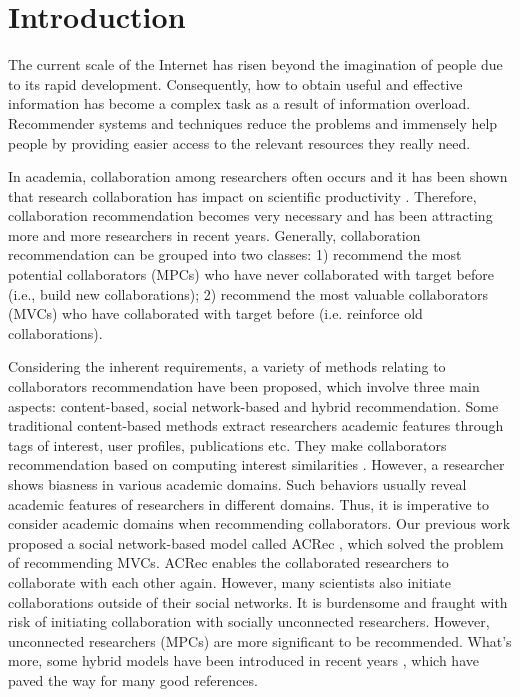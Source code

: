 \section*{Introduction}
The current scale of the Internet has risen beyond the imagination of people due to its rapid development. Consequently, how to obtain useful and effective information has become a complex task as a result of information overload. Recommender systems and techniques reduce the problems and immensely help people by providing easier access to the relevant resources they really need.

In academia, collaboration among researchers often occurs and it has been shown that research collaboration has impact on scientific productivity \cite{lee2005impact}. Therefore, collaboration recommendation becomes very necessary and has been attracting more and more researchers in recent years. Generally, collaboration recommendation can be grouped into two classes: 1) recommend the most potential collaborators (MPCs) who have never collaborated with target before (i.e., build new collaborations); 2) recommend the most valuable collaborators (MVCs) who have collaborated with target before (i.e. reinforce old collaborations).

Considering the inherent requirements, a variety of methods relating to collaborators recommendation have been proposed, which involve three main aspects: content-based, social network-based and hybrid recommendation. Some traditional content-based methods extract researchers academic features through tags of interest, user profiles, publications etc. They make collaborators recommendation based on computing interest similarities \cite{lopes2010collaboration,gollapalli2012similar,kim2010collaborative}. However, a researcher shows biasness in various academic domains. Such behaviors usually reveal academic features of researchers in different domains. Thus, it is imperative to consider academic domains when recommending collaborators. Our previous work proposed a social network-based model called ACRec \cite{li2014acrec}, which solved the problem of recommending MVCs. ACRec enables the collaborated researchers to collaborate with each other again. However, many scientists also initiate collaborations outside of their social networks. It is burdensome and fraught with risk of initiating collaboration with socially unconnected researchers. However, unconnected researchers (MPCs) are more significant to be recommended. What's more, some hybrid models have been introduced in recent years \cite{lee2011recommending,chen2011collabseer,cohen2013recommending}, which have paved the way for many good references.

